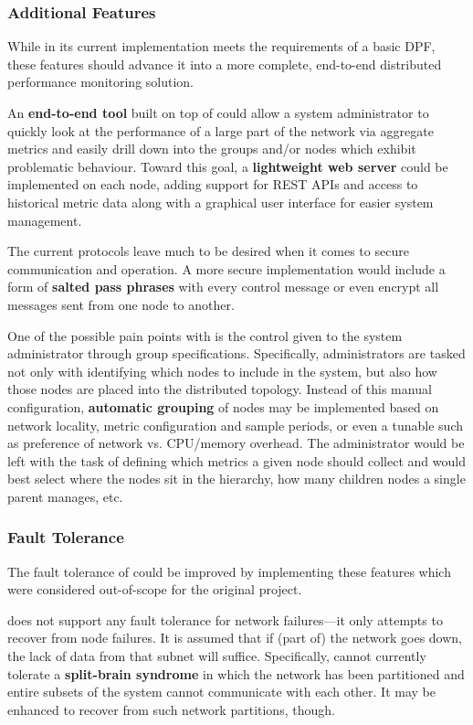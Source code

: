 \subsubsection{Additional Features}

While \dcamp in its current implementation meets the requirements of a basic DPF, these features should advance it into
a more complete, end-to-end distributed performance monitoring solution.

An \textbf{end-to-end tool} built on top of \dcamp could allow a system administrator to quickly look at the performance
of a large part of the network via aggregate metrics and easily drill down into the groups and/or nodes which exhibit
problematic behaviour. Toward this goal, a \textbf{lightweight web server} could be implemented on each node, adding
support for REST APIs and access to historical metric data along with a graphical user interface for easier \dcamp
system management.

The current \dcamp protocols leave much to be desired when it comes to secure communication and operation. A more secure
implementation would include a form of \textbf{salted pass phrases} with every control message or even encrypt all
messages sent from one node to another.

One of the possible pain points with \dcamp is the control given to the system administrator through group
specifications. Specifically, administrators are tasked not only with identifying which nodes to include in the system,
but also how those nodes are placed into the distributed topology. Instead of this manual configuration,
\textbf{automatic grouping} of nodes may be implemented based on network locality, metric configuration and sample
periods, or even a tunable such as preference of network vs. CPU/memory overhead. The administrator would be left with
the task of defining which metrics a given node should collect and \dcamp would best select where the nodes sit in the
hierarchy, how many children nodes a single parent manages, etc.

\subsubsection{Fault Tolerance}

The fault tolerance of \dcamp could be improved by implementing these features which were considered out-of-scope for
the original project.

\dcamp does not support any fault tolerance for network failures---it only attempts to recover from node failures. It is
assumed that if (part of) the network goes down, the lack of data from that subnet will suffice. Specifically, \dcamp
cannot currently tolerate a \textbf{split-brain syndrome} in which the network has been partitioned and entire subsets
of the system cannot communicate with each other. It may be enhanced to recover from such network partitions, though.


